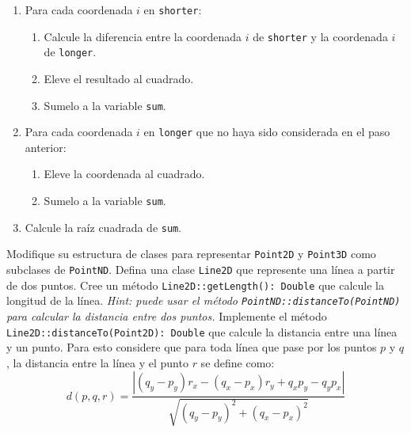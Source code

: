 \begin{Exercise}[title={Puntos en el espacio}]
\begin{enumerate}
        \item Para cada coordenada \(i\) en \texttt{shorter}:
          \begin{enumerate}
            \item Calcule la diferencia entre la coordenada \(i\) de \texttt{shorter} y la 
              coordenada \(i\) de \texttt{longer}.
            \item Eleve el resultado al cuadrado.
            \item Sumelo a la variable \texttt{sum}.
          \end{enumerate}
        \item Para cada coordenada \(i\) en \texttt{longer} que no haya sido considerada en el paso 
          anterior:
          \begin{enumerate}
            \item Eleve la coordenada al cuadrado.
            \item Sumelo a la variable \texttt{sum}.
          \end{enumerate}
        \item Calcule la raíz cuadrada de \texttt{sum}.
      \end{enumerate}
    \Question Modifique su estructura de clases para representar \texttt{Point2D} y \texttt{Point3D} 
      como subclases de \texttt{PointND}.
    \Question Defina una clase \texttt{Line2D} que represente una línea a partir de dos puntos.
    \Question Cree un método \texttt{Line2D::getLength(): Double} que calcule la longitud de la 
      línea.
      \textit{Hint: puede usar el método \texttt{PointND::distanceTo(PointND)} para calcular la
      distancia entre dos puntos.}
    \Question Implemente el método \texttt{Line2D::distanceTo(Point2D): Double} que calcule la 
      distancia entre una línea y un punto.
      Para esto considere que para toda línea que pase por los puntos \(p\) y \(q\), la distancia
      entre la línea y el punto \(r\) se define como:
      \[
        d(p, q, r) = \frac{
          |(q_y - p_y)r_x - (q_x - p_x)r_y + q_xp_y - q_yp_x|
        }{
          \sqrt{(q_y - p_y)^2 + (q_x - p_x)^2}
        }
      \]
  \end{Exercise}

